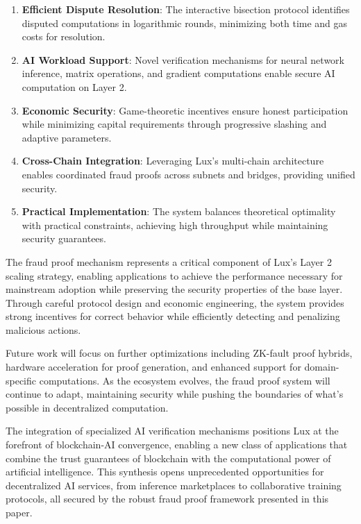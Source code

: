 \documentclass[11pt,a4paper]{article}
\theoremstyle{definition}
\begin{document}
\begin{enumerate}
    \item \textbf{Efficient Dispute Resolution}: The interactive bisection protocol identifies disputed computations in logarithmic rounds, minimizing both time and gas costs for resolution.
    
    \item \textbf{AI Workload Support}: Novel verification mechanisms for neural network inference, matrix operations, and gradient computations enable secure AI computation on Layer 2.
    
    \item \textbf{Economic Security}: Game-theoretic incentives ensure honest participation while minimizing capital requirements through progressive slashing and adaptive parameters.
    
    \item \textbf{Cross-Chain Integration}: Leveraging Lux's multi-chain architecture enables coordinated fraud proofs across subnets and bridges, providing unified security.
    
    \item \textbf{Practical Implementation}: The system balances theoretical optimality with practical constraints, achieving high throughput while maintaining security guarantees.
\end{enumerate}

The fraud proof mechanism represents a critical component of Lux's Layer 2 scaling strategy, enabling applications to achieve the performance necessary for mainstream adoption while preserving the security properties of the base layer. Through careful protocol design and economic engineering, the system provides strong incentives for correct behavior while efficiently detecting and penalizing malicious actions.

Future work will focus on further optimizations including ZK-fault proof hybrids, hardware acceleration for proof generation, and enhanced support for domain-specific computations. As the ecosystem evolves, the fraud proof system will continue to adapt, maintaining security while pushing the boundaries of what's possible in decentralized computation.

The integration of specialized AI verification mechanisms positions Lux at the forefront of blockchain-AI convergence, enabling a new class of applications that combine the trust guarantees of blockchain with the computational power of artificial intelligence. This synthesis opens unprecedented opportunities for decentralized AI services, from inference marketplaces to collaborative training protocols, all secured by the robust fraud proof framework presented in this paper.
\end{document}
